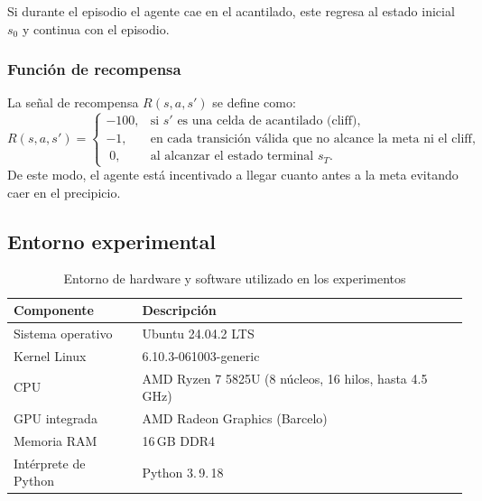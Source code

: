 Si durante el episodio el agente cae en el acantilado, este regresa al estado inicial $s_0$ y continua con el episodio.

\subsubsection{Función de recompensa}
La señal de recompensa $R(s,a,s')$ se define como:
\[
  R(s,a,s') = 
  \begin{cases}
    -100, & \text{si } s' \text{ es una celda de acantilado (cliff),}\\
    -1,   & \text{en cada transición válida que no alcance la meta ni el cliff,}\\
    \;0,  & \text{al alcanzar el estado terminal } s_T.
  \end{cases}
\]
De este modo, el agente está incentivado a llegar cuanto antes a la meta evitando caer en el precipicio.


\subsection{Entorno experimental}

\begin{table}[H]
  \centering
  \begin{tabular}{@{} ll @{}}
    \toprule
    \textbf{Componente} & \textbf{Descripción} \\
    \midrule
    Sistema operativo      & Ubuntu 24.04.2 LTS \\
    Kernel Linux           & 6.10.3-061003-generic \\
    CPU                    & AMD Ryzen 7 5825U (8 núcleos, 16 hilos, hasta 4.5\,GHz) \\
    GPU integrada          & AMD Radeon Graphics (Barcelo) \\
    Memoria RAM            & 16\,GB DDR4 \\
    Intérprete de Python   & Python 3.\,9.\,18\quad \\
    \bottomrule
  \end{tabular}
  \caption{Entorno de hardware y software utilizado en los experimentos}
  \label{tab:entorno-experimental}
\end{table}